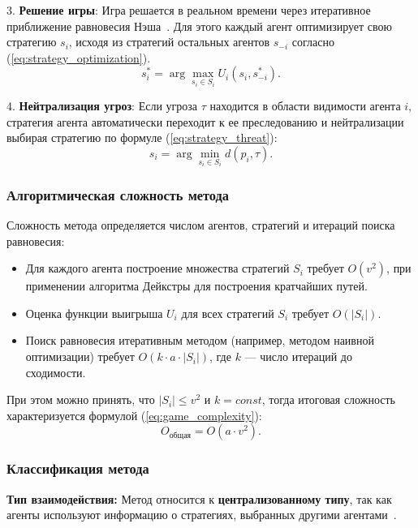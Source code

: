 3. \textbf{Решение игры}:  
Игра решается в реальном времени через итеративное приближение равновесия Нэша~\cite{parsons2002gametheory}.
Для этого каждый агент оптимизирует свою стратегию $s_i$, исходя из стратегий остальных агентов $s_{-i}$ согласно (\ref{eq:strategy_optimization}).
\begin{equation}
	\label{eq:strategy_optimization}
	s_i^* = \arg\max_{s_i \in S_i} U_i(s_i, s_{-i}^*).
\end{equation}

4. \textbf{Нейтрализация угроз}:  
Если угроза $\tau$ находится в области видимости агента $i$, стратегия агента автоматически переходит к ее преследованию и нейтрализации выбирая стратегию по формуле (\ref{eq:strategy_threat}):
\begin{equation}
	\label{eq:strategy_threat}
	s_i = \arg\min_{s_i \in S_i} d(p_i, \tau).
\end{equation}

\subsubsection*{Алгоритмическая сложность метода}
Сложность метода определяется числом агентов, стратегий и итераций поиска равновесия:
\begin{itemize}
	\item Для каждого агента построение множества стратегий $S_i$ требует $O(v^2)$, при применении алгоритма Дейкстры для построения кратчайших путей.
	\item Оценка функции выигрыша $U_i$ для всех стратегий $S_i$ требует $O(|S_i|)$.
	\item Поиск равновесия итеративным методом (например, методом наивной оптимизации) требует $O(k \cdot a \cdot |S_i|)$, где $k$ — число итераций до сходимости.
\end{itemize}

При этом можно принять, что $|S_i| \leq v^2$ и $k=const$, тогда итоговая сложность характеризуется формулой (\ref{eq:game_complexity}):
\begin{equation}
	\label{eq:game_complexity}
	O_{\text{общая}} = O(a \cdot v^2).
\end{equation}

\subsubsection*{Классификация метода}
\textbf{Тип взаимодействия:}  
Метод относится к \textbf{централизованному типу}, так как агенты используют информацию о стратегиях, выбранных другими агентами~\cite{gurevich2005multiagent}.

